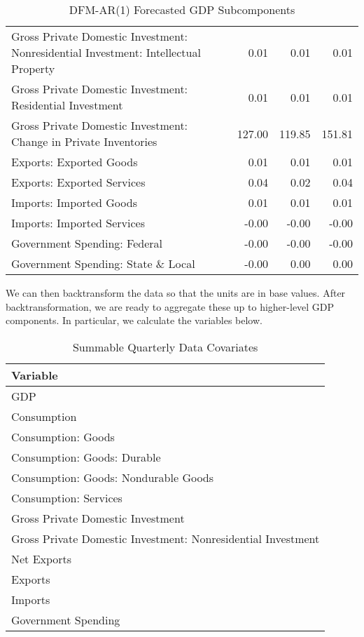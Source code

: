 \documentclass[11pt, letterpaper]{article}\usepackage[]{graphicx}\usepackage[]{color}
\begin{document}
\begin{table}[H]
\begin{tabular}{lrrr}
  Gross Private Domestic Investment: Nonresidential Investment: Intellectual Property & 0.01 & 0.01 & 0.01 \\ 
  Gross Private Domestic Investment: Residential Investment & 0.01 & 0.01 & 0.01 \\ 
  Gross Private Domestic Investment: Change in Private Inventories & 127.00 & 119.85 & 151.81 \\ 
  Exports: Exported Goods & 0.01 & 0.01 & 0.01 \\ 
  Exports: Exported Services & 0.04 & 0.02 & 0.04 \\ 
  Imports: Imported Goods & 0.01 & 0.01 & 0.01 \\ 
  Imports: Imported Services & -0.00 & -0.00 & -0.00 \\ 
  Government Spending: Federal & -0.00 & -0.00 & -0.00 \\ 
  Government Spending: State \& Local & -0.00 & 0.00 & 0.00 \\ 
   \hline
\end{tabular}
\endgroup
\caption{DFM-AR(1) Forecasted GDP Subcomponents} 
\end{table}


We can then backtransform the data so that the units are in base values. After backtransformation, we are ready to aggregate these up to higher-level GDP components. In particular, we calculate the variables below.
\begin{table}[H]
\centering
\begingroup\scriptsize
\begin{tabular}{l}
  \hline
Variable \\ 
  \hline
GDP \\ 
  Consumption \\ 
  Consumption: Goods \\ 
  Consumption: Goods: Durable \\ 
  Consumption: Goods: Nondurable Goods \\ 
  Consumption: Services \\ 
  Gross Private Domestic Investment \\ 
  Gross Private Domestic Investment: Nonresidential Investment \\ 
  Net Exports \\ 
  Exports \\ 
  Imports \\ 
  Government Spending \\ 
   \hline
\end{tabular}
\endgroup
\caption{Summable Quarterly Data Covariates} 
\end{table}
\end{document}
